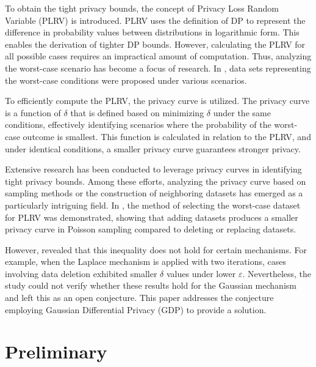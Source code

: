 \documentclass{article}
\begin{document}
To obtain the tight privacy bounds, the concept of Privacy Loss Random Variable (PLRV) \cite{dwork2016concentrated,sommer2018privacy} is introduced. PLRV uses the definition of DP to represent the difference in probability values between distributions in logarithmic form. This enables the derivation of tighter DP bounds. However, calculating the PLRV for all possible cases requires an impractical amount of computation. Thus, analyzing the worst-case scenario has become a focus of research. In \cite{zhu2022optimal}, data sets representing the worst-case conditions were proposed under various scenarios.

To efficiently compute the PLRV, the privacy curve is utilized. The privacy curve is a function of $\delta$ that is defined based on minimizing $\delta$ under the same conditions, effectively identifying scenarios where the probability of the worst-case outcome is smallest. This function is calculated in relation to the PLRV, and under identical conditions, a smaller privacy curve guarantees stronger privacy.

Extensive research has been conducted to leverage privacy curves in identifying tight privacy bounds. Among these efforts, analyzing the privacy curve based on sampling methods or the construction of neighboring datasets has emerged as a particularly intriguing field. In \cite{zhu2022optimal}, the method of selecting the worst-case dataset for PLRV was demonstrated, showing that adding datasets produces a smaller privacy curve in Poisson sampling compared to deleting or replacing datasets.

However, \cite{lebeda2024avoiding} revealed that this inequality does not hold for certain mechanisms. For example, when the Laplace mechanism is applied with two iterations, cases involving data deletion exhibited smaller $\delta$ values under lower $\varepsilon$. Nevertheless, the study could not verify whether these results hold for the Gaussian mechanism and left this as an open conjecture. This paper addresses the conjecture employing Gaussian Differential Privacy (GDP) to provide a solution.

\section{Preliminary}
\end{document}

